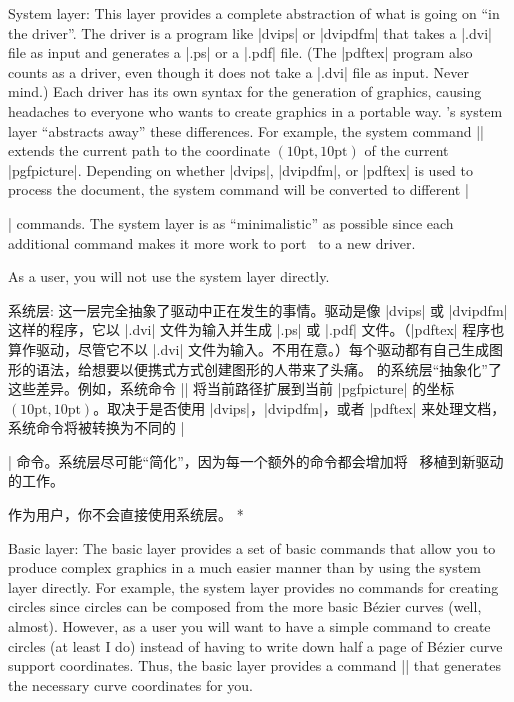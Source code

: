 \begin{description}
\begin{paracol}{2}
    \item[System layer:] This layer provides a complete abstraction of what
        is going on ``in the driver''. The driver is a program like |dvips|
        or |dvipdfm| that takes a |.dvi| file as input and generates a |.ps|
        or a |.pdf| file. (The |pdftex| program also counts as a driver, even
        though it does not take a |.dvi| file as input. Never mind.) Each
        driver has its own syntax for the generation of graphics, causing
        headaches to everyone who wants to create graphics in a portable way.
        \pgfname's system layer ``abstracts away'' these differences. For
        example, the system command |\pgfsys@lineto{10pt}{10pt}| extends the
        current path  to the coordinate $(10\mathrm{pt},10\mathrm{pt})$ of
        the current |{pgfpicture}|. Depending on whether |dvips|, |dvipdfm|,
        or |pdftex| is used to process the document, the system command will
        be converted to different |\special| commands. The system layer is as
        ``minimalistic'' as possible since each additional command makes it
        more work to port \pgfname\ to a new driver.

        As a user, you will not use the system layer directly.
\switchcolumn
    \item[系统层:]
            这一层完全抽象了驱动中正在发生的事情。驱动是像 |dvips| 或 |dvipdfm| 这样的程序，它以 |.dvi| 文件为输入并生成 |.ps| 或 |.pdf| 文件。（|pdftex| 程序也算作驱动，尽管它不以 |.dvi| 文件为输入。不用在意。）每个驱动都有自己生成图形的语法，给想要以便携式方式创建图形的人带来了头痛。 \pgfname 的系统层“抽象化”了这些差异。例如，系统命令 |\pgfsys@lineto{10pt}{10pt}| 将当前路径扩展到当前 |{pgfpicture}| 的坐标 $(10\mathrm{pt},10\mathrm{pt})$。取决于是否使用 |dvips|，|dvipdfm|，或者 |pdftex| 来处理文档，系统命令将被转换为不同的 |\special| 命令。系统层尽可能“简化”，因为每一个额外的命令都会增加将 \pgfname\ 移植到新驱动的工作。
	    
        作为用户，你不会直接使用系统层。
\switchcolumn[0]*%
    \item[Basic layer:] The basic layer provides a set of basic commands that
        allow you to produce complex graphics in a much easier manner than by
        using the system layer directly. For example, the system layer provides
        no commands for creating circles since circles can be composed from the
        more basic Bézier curves (well, almost). However, as a user you will
        want to have a simple command to create circles (at least I do) instead
        of having to write down half a page of Bézier curve support
        coordinates. Thus, the basic layer provides a command |\pgfpathcircle|
        that generates the necessary curve coordinates for you.


\end{paracol}
\end{description}
